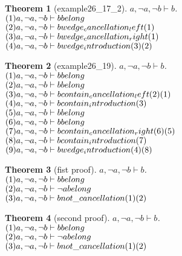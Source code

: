 \documentclass[11pt]{article}
\newtheorem{theorem}{Theorem}
\def\turn{\vdash}
\begin{document}
\begin{theorem}[example26_17_2] $ a, \neg a, \neg b \turn b $.\\
$(1)a, \neg a, \neg b \turn b \hfill belong  $\\
$(2)a, \neg a, \neg b \turn b \hfill wedge_cancellation_left (1) $\\
$(3)a, \neg a, \neg b \turn b \hfill wedge_cancellation_right (1) $\\
$(4)a, \neg a, \neg b \turn b \hfill wedge_introduction (3)(2) $\\
\end{theorem}
\begin{theorem}[example26_19] $ a, \neg a, \neg b \turn b $.\\
$(1)a, \neg a, \neg b \turn b \hfill belong  $\\
$(2)a, \neg a, \neg b \turn b \hfill belong  $\\
$(3)a, \neg a, \neg b \turn b \hfill contain_cancellation_left (2)(1) $\\
$(4)a, \neg a, \neg b \turn b \hfill contain_introduction (3) $\\
$(5)a, \neg a, \neg b \turn b \hfill belong  $\\
$(6)a, \neg a, \neg b \turn b \hfill belong  $\\
$(7)a, \neg a, \neg b \turn b \hfill contain_cancellation_right (6)(5) $\\
$(8)a, \neg a, \neg b \turn b \hfill contain_introduction (7) $\\
$(9)a, \neg a, \neg b \turn b \hfill wedge_introduction (4)(8) $\\
\end{theorem}
\begin{theorem}[fist proof] $ a, \neg a, \neg b \turn b $.\\
$(1)a, \neg a, \neg b \turn b \hfill belong $\\
$(2)a, \neg a, \neg b \turn \neg a \hfill belong $\\
$(3)a, \neg a, \neg b \turn b \hfill not \_ cancellation (1)(2) $\\
\end{theorem}
\begin{theorem}[second proof] $ a, \neg a, \neg b \turn b $.\\
$(1)a, \neg a, \neg b \turn b \hfill belong $\\
$(2)a, \neg a, \neg b \turn \neg a \hfill belong $\\
$(3)a, \neg a, \neg b \turn b \hfill not \_ cancellation (1)(2) $\\
\end{theorem}
\end{document}
